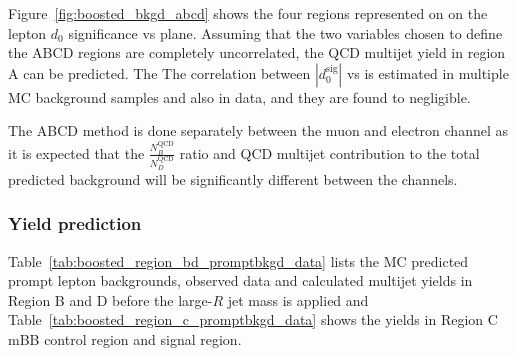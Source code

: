 Figure~\ref{fig:boosted_bkgd_abcd} shows the four regions represented on on the lepton $d_{0}$ significance vs \met plane.
Assuming that the two variables chosen to define the ABCD regions are completely uncorrelated, the QCD multijet yield in region A can be predicted. The The correlation between $|d_{0}^{\textrm{sig}}|$ vs \met is estimated in multiple MC background samples and also in data, and they are found to negligible.%
 
The ABCD method is done separately between the muon and electron channel as it is expected that the $\frac{N_B^\text{QCD}}{N_D^\text{QCD}}$ ratio and QCD multijet contribution to the total predicted background will be significantly different between the channels.
 
%
%
\subsubsection{Yield prediction}
\label{sec:boosted_bkgd_qcdmultijet_yield}
 
Table~\ref{tab:boosted_region_bd_promptbkgd_data} lists the MC predicted prompt lepton backgrounds, observed data
and calculated multijet yields in Region B and D before the large-$R$ jet mass is applied and Table~\ref{tab:boosted_region_c_promptbkgd_data}
shows the yields in Region C mBB control region and signal region.
 
